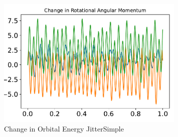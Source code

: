 \begin{figure}[htbp]\centerline{\includegraphics[width=0.80\textwidth]{AutoTeX/ChangeInOrbitalEnergyJitterSimple}}\caption{Change in Orbital Energy JitterSimple}\label{fig:ChangeInOrbitalEnergyJitterSimple}\end{figure}